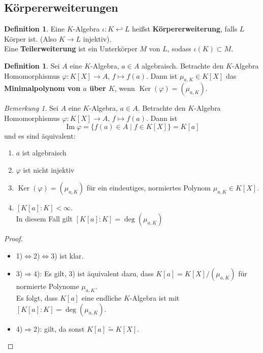 \documentclass[10pt,a4paper]{article}
\newcommand{\isomorph}{\ensuremath{\tilde{=}}}
\newcommand{\Ker}{\ensuremath{\operatorname{Ker}}}
\newcommand{\Img}{\ensuremath{\operatorname{Im}}}
\newcounter{thm}[section]
\theoremstyle{definition}
\newtheorem{definition}[thm]{Definition}
\theoremstyle{plain}
\theoremstyle{remark}
\newtheorem*{bem*}{Bemerkung}
\begin{document}
\subsection{Körpererweiterungen}

\begin{definition}
	Eine $K$-Algebra $\iota:K\hookleftarrow L$ heißst \textbf{Körpererweiterung}, falls $L$ Körper ist. (Also $K\to L$ injektiv).\\
	Eine \textbf{Teilerweiterung} ist ein Unterkörper $M$ von $L$, sodass $\iota(K)\subset M$.
\end{definition}



\setcounter{subsection}{4}
\setcounter{thm}{16}


\begin{definition}
	Sei $A$ eine $K$-Algebra, $a\in A$ algebraisch. Betrachte den $K$-Algebra Homomorphismus $\varphi:K[X]\rightarrow A$, $f\mapsto f(a)$.
	Dann ist $\mu_{a,K}\in K[X]$ das \textbf{Minimalpolynom von $a$ über $K$}, wenn $\Ker(\varphi)=(\mu_{a,K})$.
\end{definition}
\begin{bem*}
	Sei $A$ eine $K$-Algebra, $a\in A$. Betrachte den $K$-Algebra Homomorphismus $\varphi:K[X]\rightarrow A$, $f\mapsto f(a)$. Dann ist
	\[\Img\varphi=\{f(a)\in A\mid f\in K[X]\}=K[a]\]
	und es sind äquivalent:
	\begin{enumerate}
		\item $a$ ist algebraisch
		\item $\varphi$ ist nicht injektiv
		\item $\Ker(\varphi)=(\mu_{a,K})$ für ein eindeutiges, normiertes Polynom $\mu_{a,K}\in K[X]$.
		\item  $[K[a]:K]<\infty$.\\
		In diesem Fall gilt $[K[a]:K]=\deg(\mu_{a,K})$
	\end{enumerate}
\end{bem*}
\begin{proof}
	\begin{itemize}
		\item 1)$\Leftrightarrow$2)$\Leftrightarrow$3) ist klar.
		\item 3)$\Rightarrow$4): Es gilt, 3) ist äquivalent dazu, dass $K[a]=K[X]/(\mu_{a,K})$ für normierte Polynome $\mu_{a,K}$.\\
		Es folgt, dass $K[a]$ eine endliche $K$-Algebra ist mit $[K[a]:K]=\deg(\mu_{a,K})$.
		\item 4)$\Rightarrow$2): gilt, da sonst $K[a]\isomorph K[X]$.
	\end{itemize}
	
\end{proof}
\end{document}
